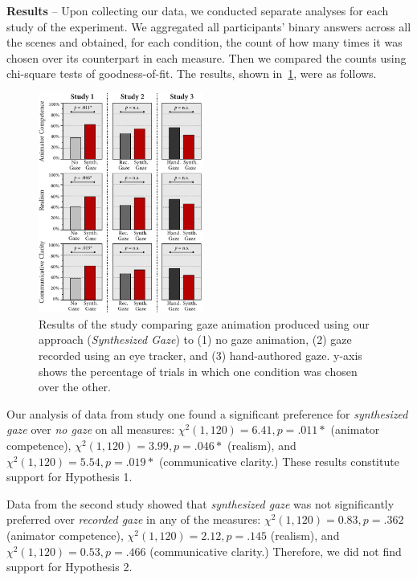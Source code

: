 \noindent\textbf{Results} -- Upon collecting our data, we conducted separate analyses for each study of the experiment. We aggregated all participants' binary answers across all the scenes and obtained, for each condition, the count of how many times it was chosen over its counterpart in each measure. Then we compared the counts using chi-square tests of goodness-of-fit. The results, shown in~\ref{fig:StudyResults}, were as follows.

\begin{figure}[t]
\centering
\includegraphics[width=0.48\textwidth]{Figures/StudyResults.pdf}
\caption{Results of the study comparing gaze animation produced using our approach (\emph{Synthesized Gaze}) to (1) no gaze animation, (2) gaze recorded using an eye tracker, and (3) hand-authored gaze. y-axis shows the percentage of trials in which one condition was chosen over the other.}
\label{fig:StudyResults}
\end{figure}

Our analysis of data from study one found a significant preference for \emph{synthesized gaze} over \emph{no gaze} on all measures: $\chi^2(1, 120) = 6.41, p = .011*$ (animator competence), $\chi^2(1, 120) = 3.99, p = .046*$ (realism), and $\chi^2(1, 120) = 5.54, p = .019*$ (communicative clarity.) These results constitute support for Hypothesis 1.

Data from the second study showed that \emph{synthesized gaze} was not significantly preferred over \emph{recorded gaze} in any of the measures: $\chi^2(1, 120) = 0.83, p = .362$ (animator competence), $\chi^2(1, 120) = 2.12, p = .145$ (realism), and $\chi^2(1, 120) = 0.53, p = .466$ (communicative clarity.) Therefore, we did not find support for Hypothesis 2.

